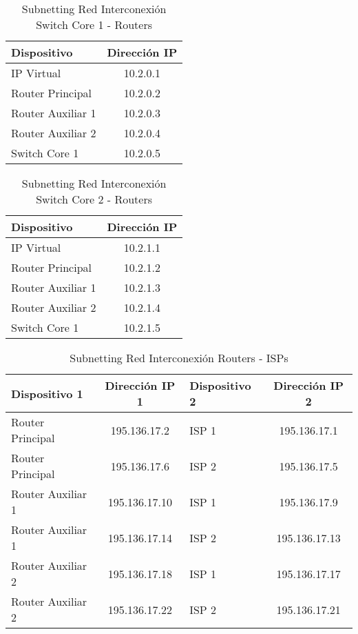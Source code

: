 \begin{table}[H]
    \centering
    \scriptsize
    \begin{tabular}{|l|c|}
        \hline
        \textbf{Dispositivo} & \textbf{Dirección IP} \\
        \hline
        IP Virtual & 10.2.0.1 \\
        \hline
        Router Principal & 10.2.0.2 \\
        \hline
        Router Auxiliar 1 & 10.2.0.3 \\
        \hline
        Router Auxiliar 2 & 10.2.0.4 \\
        \hline
        Switch Core 1 & 10.2.0.5 \\
        \hline
    \end{tabular}
    \caption{Subnetting Red Interconexión Switch Core 1 - Routers}
    \label{tab:InterconexionCore1-RouterSE}
\end{table}

\begin{table}[H]
    \centering
    \scriptsize
    \begin{tabular}{|l|c|}
        \hline
        \textbf{Dispositivo} & \textbf{Dirección IP} \\
        \hline
        IP Virtual & 10.2.1.1 \\
        \hline
        Router Principal & 10.2.1.2 \\
        \hline
        Router Auxiliar 1 & 10.2.1.3 \\
        \hline
        Router Auxiliar 2 & 10.2.1.4 \\
        \hline
        Switch Core 1 & 10.2.1.5 \\
        \hline
    \end{tabular}
    \caption{Subnetting Red Interconexión Switch Core 2 - Routers}
    \label{tab:InterconexionCore2-RouterSE}
\end{table}

\begin{table}[H]
    \centering
    \scriptsize
    \begin{tabular}{|l|c|l|c|}
        \hline
        \textbf{Dispositivo 1} & \textbf{Dirección IP 1} & \textbf{Dispositivo 2} & \textbf{Dirección IP 2}\\
        \hline
        Router Principal & 195.136.17.2 & ISP 1 & 195.136.17.1 \\
        \hline
        Router Principal & 195.136.17.6 & ISP 2 & 195.136.17.5 \\
        \hline
        Router Auxiliar 1 & 195.136.17.10 & ISP 1 & 195.136.17.9 \\
        \hline
        Router Auxiliar 1 & 195.136.17.14 & ISP 2 & 195.136.17.13 \\
        \hline
        Router Auxiliar 2 & 195.136.17.18 & ISP 1 & 195.136.17.17 \\
        \hline
        Router Auxiliar 2 & 195.136.17.22 & ISP 2 & 195.136.17.21 \\
        \hline
    \end{tabular}
    \caption{Subnetting Red Interconexión Routers - ISPs}
    \label{tab:InterconexionRouter-ISPSE}
\end{table}

